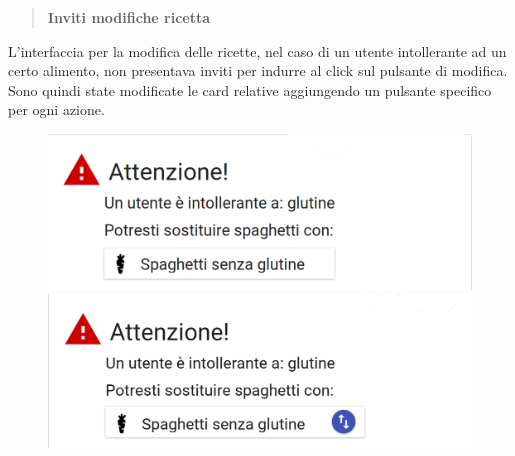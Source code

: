 \begin{quote}
	\textbf{Inviti modifiche ricetta}
\end{quote}

L'interfaccia per la modifica delle ricette, nel caso di un utente intollerante
ad un certo alimento, non presentava inviti per indurre al click sul pulsante di
modifica.  Sono quindi state modificate le card relative aggiungendo un pulsante
specifico per ogni azione.
\begin{figure}[H]
	\begin{minipage}{.49\textwidth}
		\includegraphics[width=\textwidth]{img/modifiche/cambia_ingrediente_old.png}
	\end{minipage}
	\begin{minipage}{.49\textwidth}
		\includegraphics[width=\textwidth]{img/modifiche/cambia_ingrediente_new.png}
	\end{minipage}
\end{figure}


